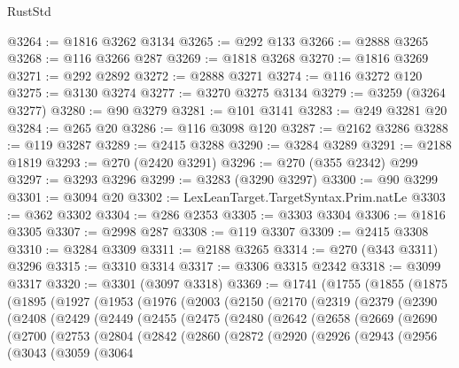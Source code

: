 \begin{lexlean}{RustStd}
\begin{coremodule}
@3264 := @1816 @3262 @3134
@3265 := @292 @133
@3266 := @2888 @3265
@3268 := @116 @3266 @287
@3269 := @1818 @3268
@3270 := @1816 @3269
@3271 := @292 @2892
@3272 := @2888 @3271
@3274 := @116 @3272 @120
@3275 := @3130 @3274
@3277 := @3270 @3275 @3134
@3279 := @3259 (@3264 @3277)
@3280 := @90 @3279
@3281 := @101 @3141
@3283 := @249 @3281 @20
@3284 := @265 @20
@3286 := @116 @3098 @120
@3287 := @2162 @3286
@3288 := @119 @3287
@3289 := @2415 @3288
@3290 := @3284 @3289
@3291 := @2188 @1819
@3293 := @270 (@2420 @3291)
@3296 := @270 (@355 @2342) @299
@3297 := @3293 @3296
@3299 := @3283 (@3290 @3297)
@3300 := @90 @3299
@3301 := @3094 @20
@3302 := LexLeanTarget.TargetSyntax.Prim.natLe
@3303 := @362 @3302
@3304 := @286 @2353
@3305 := @3303 @3304
@3306 := @1816 @3305
@3307 := @2998 @287
@3308 := @119 @3307
@3309 := @2415 @3308
@3310 := @3284 @3309
@3311 := @2188 @3265
@3314 := @270 (@343 @3311) @3296
@3315 := @3310 @3314
@3317 := @3306 @3315 @2342
@3318 := @3099 @3317
@3320 := @3301 (@3097 @3318)
@3369 := @1741
    (@1755
      (@1855
        (@1875
          (@1895
            (@1927
              (@1953
                (@1976
                  (@2003
                    (@2150
                      (@2170
                        (@2319
                          (@2379
                            (@2390
                              (@2408
                                (@2429
                                  (@2449
                                    (@2455
                                      (@2475
                                        (@2480
                                          (@2642
                                            (@2658
                                              (@2669
                                                (@2690
                                                  (@2700
                                                    (@2753
                                                      (@2804
                                                        (@2842
                                                          (@2860
                                                            (@2872
                                                              (@2920
                                                                (@2926
                                                                  (@2943
                                                                    (@2956
                                                                      (@3043
                                                                        (@3059
                                                                          (@3064

\end{coremodule}
\end{lexlean}
